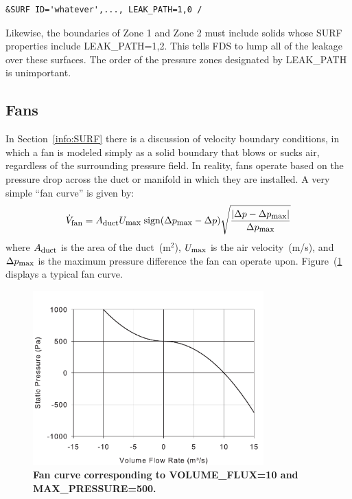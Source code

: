\documentclass[11pt]{book}
\newcommand{\be}{\begin{equation}}
\newcommand{\ee}{\end{equation}}
\begin{document}
\footnotesize
\begin{verbatim}
&SURF ID='whatever',..., LEAK_PATH=1,0 /
\end{verbatim}
\normalsize

\noindent
Likewise, the boundaries of Zone 1 and Zone 2 must include solids whose {\ct SURF} properties include {\ct LEAK\_PATH=1,2}. This tells FDS to lump all of the
leakage over these surfaces. The order of the pressure zones designated by {\ct LEAK\_PATH} is unimportant.




\subsection{Fans}
\label{info:Fans}

In Section~\ref{info:SURF} there is a discussion of velocity boundary conditions, in which a fan is modeled simply as a solid boundary that blows or
sucks air, regardless of the surrounding pressure field. In reality, fans operate based on the pressure drop across the duct or manifold in which they are
installed. A very simple ``fan curve'' is given by:
\be \dot{V}_{\hbox{\footnotesize fan}} = A_{\hbox{\footnotesize duct}} U_{\hbox{\footnotesize max}} \;
   \hbox{sign} (\Delta p_{\hbox{\footnotesize max}}-\Delta p)
   \sqrt{ \frac{ |\Delta p - \Delta p_{\hbox{\footnotesize max}}|}{\Delta p_{\hbox{\footnotesize max}} } }  \ee
where $A_{\hbox{\footnotesize duct}}$ is the area of the duct~(m$^2$), $U_{\hbox{\footnotesize max}}$ is the air velocity~(m/s), and $\Delta p_{\hbox{\footnotesize max}}$ is the maximum
pressure difference the fan can operate upon. Figure~(\ref{fig:Fan_Curve} displays a typical fan curve.

\begin{figure}[ht!]
\begin{center}
\includegraphics[width=3.5in]{FIGURES/Fan_Curve}
\caption{\bf Fan curve corresponding to {\ct VOLUME\_FLUX=10} and {\ct MAX\_PRESSURE=500}.}
\label{fig:Fan_Curve}
\end{center}
\end{figure}
\end{document}
